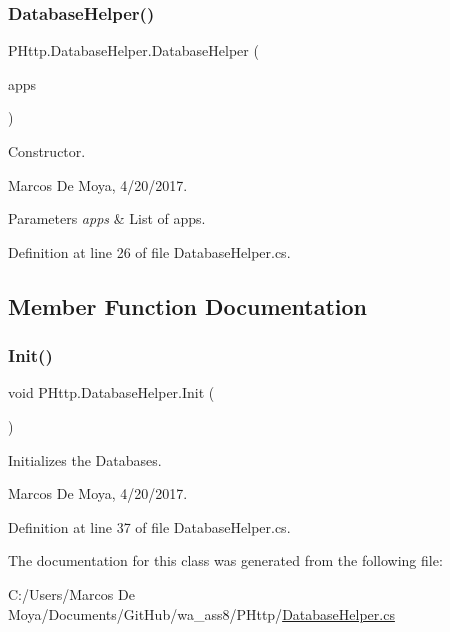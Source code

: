 \subsubsection{\texorpdfstring{Database\+Helper()}{DatabaseHelper()}}
{\footnotesize\ttfamily P\+Http.\+Database\+Helper.\+Database\+Helper (\begin{DoxyParamCaption}\item[{List$<$ \hyperlink{class_p_http_1_1_app_info}{App\+Info} $>$}]{apps }\end{DoxyParamCaption})}



Constructor. 

Marcos De Moya, 4/20/2017. 


\begin{DoxyParams}{Parameters}
{\em apps} & List of apps. \\
\hline
\end{DoxyParams}


Definition at line 26 of file Database\+Helper.\+cs.



\subsection{Member Function Documentation}
\mbox{\label{class_p_http_1_1_database_helper_a018277fa7d5e84bd4f1d798ed353fe9d}} 
\subsubsection{\texorpdfstring{Init()}{Init()}}
{\footnotesize\ttfamily void P\+Http.\+Database\+Helper.\+Init (\begin{DoxyParamCaption}{ }\end{DoxyParamCaption})}



Initializes the Databases. 

Marcos De Moya, 4/20/2017. 

Definition at line 37 of file Database\+Helper.\+cs.



The documentation for this class was generated from the following file\+:\begin{DoxyCompactItemize}
\item 
C\+:/\+Users/\+Marcos De Moya/\+Documents/\+Git\+Hub/wa\+\_\+ass8/\+P\+Http/\hyperlink{_database_helper_8cs}{Database\+Helper.\+cs}\end{DoxyCompactItemize}
